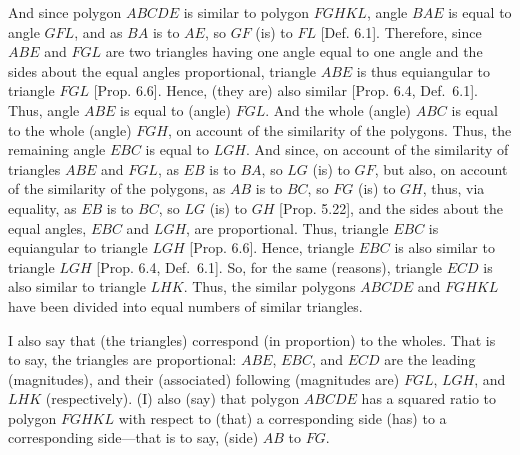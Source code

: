 \begin{Parallel}{}{}
{And since polygon $ABCDE$ is similar to polygon $FGHKL$, angle
$BAE$ is equal to angle $GFL$,
and as $BA$ is to $AE$, so $GF$ (is) to $FL$ [Def. 6.1].
Therefore, since $ABE$ and $FGL$ are two triangles having one angle equal
to one angle  and the sides about the equal angles proportional, triangle
$ABE$ is thus equiangular to triangle $FGL$ [Prop. 6.6]. Hence, (they are) also similar
 [Prop. 6.4, Def.~6.1]. Thus, angle $ABE$ is equal to
(angle) $FGL$.  And the whole (angle) $ABC$ is equal to the whole (angle)
$FGH$, on  account of the similarity of the polygons. Thus, the remaining
angle $EBC$ is equal to $LGH$. And since, on account of the similarity of
triangles $ABE$ and $FGL$, as $EB$ is to $BA$, so $LG$ (is) to $GF$, but 
also, on account of the similarity of the polygons, as $AB$ is to $BC$, so
$FG$ (is) to $GH$, thus, via equality, as $EB$ is to $BC$, so $LG$ (is) to $GH$ [Prop. 5.22], and the sides about the
equal angles, $EBC$ and $LGH$, are  proportional. Thus, triangle
$EBC$ is equiangular to triangle $LGH$ [Prop. 6.6]. Hence, triangle $EBC$ is also
similar to triangle $LGH$  [Prop. 6.4, Def.~6.1]. So, for the same (reasons), triangle
$ECD$ is also similar to triangle $LHK$. Thus, the similar
polygons $ABCDE$ and $FGHKL$ have been divided into
equal numbers of similar triangles.

I also say that (the triangles) correspond (in proportion) to the wholes.
That is to say,  the triangles are proportional:  $ABE$, $EBC$, and
$ECD$ are the leading (magnitudes), and their (associated) following (magnitudes are) 
$FGL$, $LGH$, and $LHK$ (respectively). (I) also (say) that polygon
$ABCDE$ has a squared ratio to polygon $FGHKL$ with respect to
(that) a corresponding side (has) to a corresponding side---that is to
say, (side) $AB$ to $FG$.

}
\end{Parallel}
